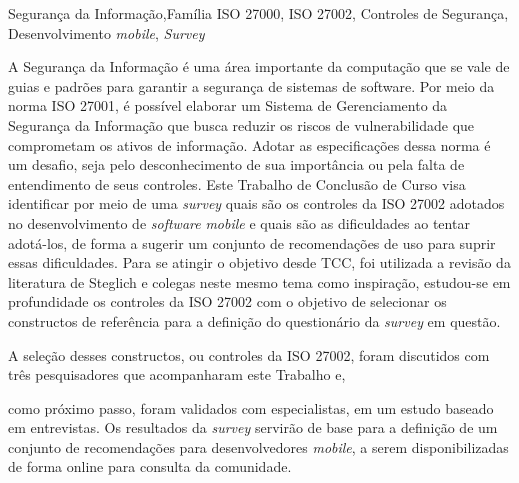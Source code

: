 \documentclass[portuguese,oneside]{tcc}
\begin{document}
\begin{resumo}{Segurança da Informação,Família ISO 27000, ISO 27002, Controles de Segurança, Desenvolvimento \textit{mobile}, \textit{Survey}}

 A Segurança da Informação é uma área importante da computação que se vale de guias e padrões para garantir a segurança de sistemas de software. Por meio da norma ISO 27001, é possível elaborar um Sistema de Gerenciamento da Segurança da Informação que busca reduzir os riscos de vulnerabilidade que comprometam os ativos de informação. Adotar as especificações dessa norma é um desafio, seja pelo desconhecimento de sua importância ou pela falta de entendimento de seus controles. Este Trabalho de Conclusão de Curso visa identificar por meio de uma \textit{survey} quais são os controles da ISO 27002 adotados no desenvolvimento de \textit{software} \textit{mobile} e quais são as dificuldades ao tentar adotá-los, de forma a sugerir um conjunto de recomendações de uso para suprir essas dificuldades. Para se atingir o objetivo desde TCC, foi utilizada a revisão da literatura de Steglich e colegas \cite{caio2019} neste mesmo tema como inspiração, estudou-se em profundidade os controles da ISO 27002 com o objetivo de selecionar os constructos de referência para a definição do questionário da \textit{survey} em questão. 
 
 A seleção desses constructos, ou controles da ISO 27002, foram discutidos com três pesquisadores que acompanharam este Trabalho e, 
 
 como próximo passo, foram validados com especialistas, em um estudo baseado em entrevistas. Os resultados da \textit{survey} servirão de base para a definição de um conjunto de recomendações para desenvolvedores \textit{mobile}, a serem disponibilizadas de forma online para consulta da comunidade.     
 




\end{resumo}
\end{document}
